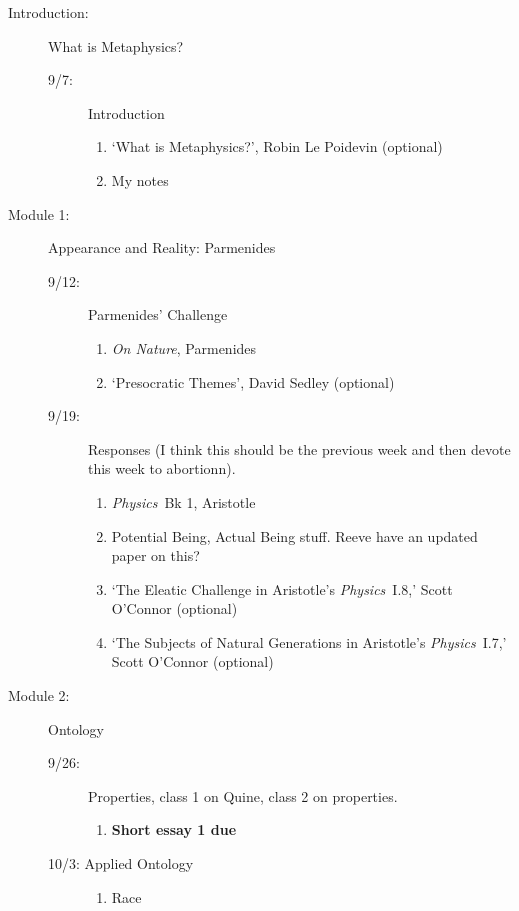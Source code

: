\documentclass[article,oneside]{memoir}
\begin{document}
\begin{description}
\item[Introduction:]  What  is Metaphysics? 
\begin{description}
\item [9/7:] Introduction
\begin{enumerate}
\item `What is Metaphysics?', Robin Le Poidevin (optional)
\item My notes
\end{enumerate}
\end{description}

\item[Module 1:] Appearance and Reality: Parmenides 
\begin{description}
\item [9/12:] Parmenides' Challenge
\begin{enumerate}
\item \emph{On Nature}, Parmenides
\item `Presocratic Themes', David Sedley (optional)
\end{enumerate}

\item [9/19:] Responses (I think this should be the previous week and then devote this week to abortionn). 
\begin{enumerate}
\item \emph{Physics}\ Bk 1, Aristotle
\item Potential Being, Actual Being stuff. Reeve have an updated paper on this?
\item `The Eleatic Challenge in Aristotle's \emph{Physics}\ I.8,' Scott O'Connor (optional)
\item `The Subjects of Natural Generations in Aristotle's \emph{Physics}\ I.7,' Scott O'Connor (optional)
 
\end{enumerate}
\end{description}

\item[Module 2:] Ontology
\begin{description}
\item [9/26:] Properties, class 1 on Quine, class 2 on properties.
\begin{enumerate}
\item \textbf{Short essay 1 due}
\end{enumerate}

\item[10/3: Applied Ontology] 
\begin{enumerate}
\item Race
\end{enumerate}


\end{description}
\end{description}
\end{document}
